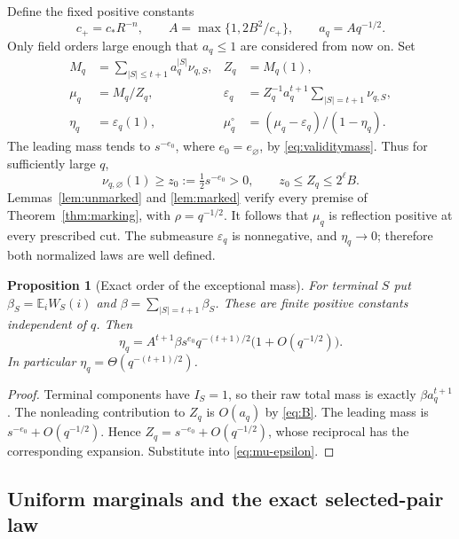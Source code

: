 \documentclass[11pt,a4paper]{article}
\numberwithin{equation}{section}
\newtheorem{proposition}[theorem]{Proposition}
\theoremstyle{definition}
\theoremstyle{remark}
\newcommand{\E}{\mathbb E}
\begin{document}
Define the fixed positive constants
\begin{equation}
 c_+=c_*R^{-n},\qquad
 A=\max\{1,2B^2/c_+\},\qquad a_q=Aq^{-1/2}.
 \label{eq:optimizedweight}
\end{equation}
Only field orders large enough that $a_q\le1$ are considered from now
on. Set
\begin{align}
 M_q&=\sum_{|S|\le t+1}a_q^{|S|}\nu_{q,S},& Z_q&=M_q(1),
       \label{eq:concretemixture}\\
 \mu_q&=M_q/Z_q,&
 \varepsilon_q&=Z_q^{-1}a_q^{t+1}\sum_{|S|=t+1}\nu_{q,S},
       \label{eq:mu-epsilon}\\
 \eta_q&=\varepsilon_q(1),&
 \mu_q^\circ&=(\mu_q-\varepsilon_q)/(1-\eta_q).
       \label{eq:nonexceptional}
\end{align}
The leading mass tends to $s^{-e_0}$, where $e_0=e_\varnothing$,
by \eqref{eq:validitymass}. Thus for sufficiently large $q$,
\begin{equation}
 \nu_{q,\varnothing}(1)\ge z_0:=\tfrac12s^{-e_0}>0,
 \qquad z_0\le Z_q\le2^\ell B.
 \label{eq:z0}
\end{equation}
Lemmas~\ref{lem:unmarked} and \ref{lem:marked} verify every premise
of Theorem~\ref{thm:marking}, with $\rho=q^{-1/2}$.
It follows that $\mu_q$ is reflection positive at every prescribed cut.
The submeasure $\varepsilon_q$ is nonnegative, and $\eta_q\to0$;
therefore both normalized laws are well defined.

\begin{proposition}[Exact order of the exceptional mass]
\label{prop:eta}
For terminal $S$ put
$\beta_S=\E_i W_S(i)$ and $\beta=\sum_{|S|=t+1}\beta_S$.
These are finite positive constants independent of $q$. Then
\begin{equation}
 \eta_q=A^{t+1}\beta s^{e_0}q^{-(t+1)/2}
                       \bigl(1+O(q^{-1/2})\bigr).
 \label{eq:etaasymptotic}
\end{equation}
In particular $\eta_q=\Theta(q^{-(t+1)/2})$.
\end{proposition}
\begin{proof}
Terminal components have $I_S=1$, so their raw total mass is exactly
$\beta a_q^{t+1}$. The nonleading contribution to $Z_q$ is $O(a_q)$
by \eqref{eq:B}. The leading mass is
$s^{-e_0}+O(q^{-1/2})$. Hence
$Z_q=s^{-e_0}+O(q^{-1/2})$, whose reciprocal has the corresponding
expansion. Substitute into \eqref{eq:mu-epsilon}.
\end{proof}

\subsection{Uniform marginals and the exact selected-pair law}
\end{document}
